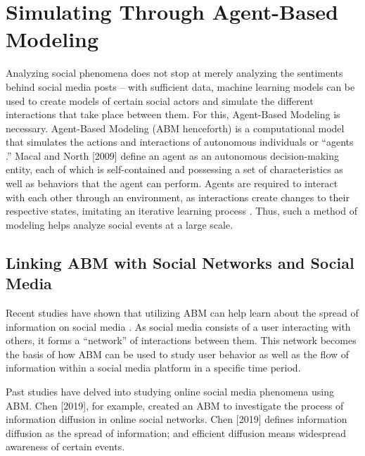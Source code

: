 \section{Simulating Through Agent-Based Modeling}
Analyzing social phenomena does not stop at merely analyzing the sentiments behind social media posts – with sufficient data, machine learning models can be used to create models of certain social actors and simulate the different interactions that take place between them. For this, Agent-Based Modeling is necessary. Agent-Based Modeling (ABM henceforth) is a computational model that simulates the actions and interactions of autonomous individuals or “agents \cite{Macal-2009}.” Macal and North [2009] define an agent as an autonomous decision-making entity, each of which is self-contained and possessing a set of characteristics as well as behaviors that the agent can perform. Agents are required to interact with each other through an environment, as interactions create changes to their respective states, imitating an iterative learning process \cite{Macal-2009}. Thus, such a method of modeling helps analyze social events at a large scale.

\subsection{Linking ABM with Social Networks and Social Media}
Recent studies have shown that utilizing ABM can help learn about the spread of information on social media \cite{Fan-2018,Chen-2019,DiCarlo-2021,Coscia-2022}. As social media consists of a user interacting with others, it forms a “network” of interactions between them. This network becomes the basis of how ABM can be used to study user behavior as well as the flow of information within a social media platform in a specific time period.

Past studies have delved into studying online social media phenomena using ABM. Chen [2019], for example, created an ABM to investigate the process of information diffusion in online social networks. Chen [2019] defines information diffusion as the spread of information; and efficient diffusion means widespread awareness of certain events.

